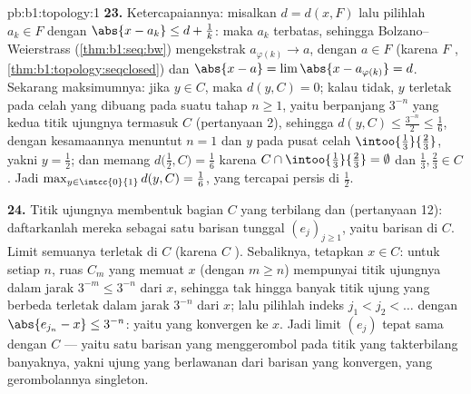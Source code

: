 \begin{solution}{pb:b1:topology:1}
\textbf{23.} Ketercapaiannya: misalkan $d = d(x, F)$ lalu pilihlah $a_k \in F$
dengan $\abs{x - a_k} \leq d + \frac1k$: maka $a_k$ terbatas, sehingga
Bolzano--Weierstrass (\cref{thm:b1:seq:bw}) mengekstrak
$a_{\varphi(k)} \to a$, dengan $a \in F$ (karena $F$ ,
\cref{thm:b1:topology:seqclosed}) dan $\abs{x - a} = \lim
\abs{x - a_{\varphi(k)}} = d$. Sekarang maksimumnya: jika $y \in C$, maka
$d(y, C) = 0$; kalau tidak, $y$ terletak pada celah yang dibuang pada suatu tahap
$n \geq 1$, yaitu   berpanjang $3^{-n}$ yang kedua
titik ujungnya termasuk $C$ (pertanyaan 2), sehingga $d(y, C) \leq
\frac{3^{-n}}{2} \leq \frac16$, dengan kesamaannya menuntut $n = 1$
dan $y$ pada pusat celah $\intoo{\frac13}{\frac23}$,
yakni $y = \frac12$; dan memang $d\bigl(\frac12, C\bigr) =
\frac16$ karena $C \cap \intoo{\frac13}{\frac23} = \emptyset$ dan
$\frac13, \frac23 \in C$. Jadi $\max_{y\in\intcc{0}{1}} d(y, C)
= \frac16$, yang tercapai persis di $\frac12$.

\textbf{24.} Titik ujungnya membentuk  bagian $C$ yang terbilang dan 
(pertanyaan 12): daftarkanlah mereka sebagai satu barisan tunggal $(e_j)_{j\geq1}$,
yaitu barisan di $C$. Limit  semuanya terletak di $C$ (karena $C$
). Sebaliknya, tetapkan $x \in C$: untuk setiap $n$, ruas
$C_m$ yang memuat $x$ (dengan $m \geq n$) mempunyai titik ujungnya
dalam jarak $3^{-m} \leq 3^{-n}$ dari $x$, sehingga tak hingga banyak titik ujung
yang berbeda terletak dalam jarak $3^{-n}$ dari $x$; lalu pilihlah indeks $j_1 < j_2
< \dots$ dengan $\abs{e_{j_n} - x} \leq 3^{-n}$: yaitu 
yang konvergen ke $x$. Jadi  limit  $(e_j)$
tepat sama dengan $C$ --- yaitu satu barisan yang menggerombol pada titik yang
takterbilang banyaknya, yakni ujung yang berlawanan dari barisan yang konvergen, yang
 gerombolannya singleton.


\end{solution}
